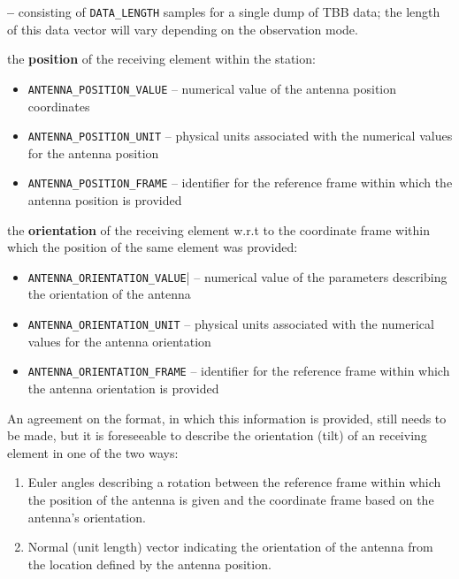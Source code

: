 \documentclass[a4paper,10pt,bibtotoc]{scrartcl}
\begin{document}
\begin{list}{\textbf{--}}{}
  consisting of \verb|DATA_LENGTH| samples for a single dump of TBB data; the
  length of this data vector will vary depending on the observation mode. \\
\item the \textbf{position} of the receiving element within the station:
  \begin{itemize} \parskip 0pt
  \item \verb|ANTENNA_POSITION_VALUE| -- numerical value of the antenna position
    coordinates
  \item \verb|ANTENNA_POSITION_UNIT| -- physical units associated with the numerical
    values for the antenna position
  \item \verb|ANTENNA_POSITION_FRAME| -- identifier for the reference frame within
    which the antenna position is provided
  \end{itemize}
\item the \textbf{orientation} of the receiving element w.r.t to the coordinate
  frame within which the position of the same element was provided:
  \begin{itemize}
  \item \verb|ANTENNA_ORIENTATION_VALUE|| -- numerical value of the parameters 
    describing the orientation of the antenna
  \item \verb|ANTENNA_ORIENTATION_UNIT| -- physical units associated with the
    numerical values for the antenna orientation
  \item \verb|ANTENNA_ORIENTATION_FRAME| -- identifier for the reference frame
    within which the antenna orientation is provided
  \end{itemize}
  An agreement on the format, in which this information is provided, still needs
  to be made, but it is foreseeable to describe the orientation (tilt) of an
  receiving element in one of the two ways:
  \begin{enumerate}
  \item Euler angles describing a rotation between the reference frame within 
    which the position of the antenna is given and the coordinate frame based on
    the antenna's orientation.
  \item Normal (unit length) vector indicating the orientation of the antenna
    from the location defined by the antenna position.
  \end{enumerate}
\end{list}

\end{document}
